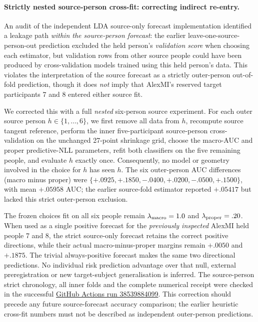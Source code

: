 \paragraph{Strictly nested source-person cross-fit: correcting indirect re-entry.}
\label{sec:p1-strict-nested-source-audit}
An audit of the independent LDA source-only
forecast implementation identified a leakage
path \emph{within the source-person forecast}:
the earlier leave-one-source-person-out prediction
excluded the held person's \emph{validation score}
when choosing each estimator, but validation rows
from other source people could have been produced
by cross-validation models trained using this
held person's data. This violates the interpretation
of the source forecast as a strictly outer-person
out-of-fold prediction, though it does \emph{not}
imply that AlexMI's reserved target participants
7 and 8 entered either source fit.

We corrected this with a full \emph{nested}
six-person source experiment. For each outer
source person $h\in\{1,\ldots,6\}$, we first
remove all data from $h$, recompute source
tangent reference, perform the inner
five-participant source-person cross-validation
on the unchanged 27-point shrinkage grid, choose
the macro-AUC and proper predictive-NLL parameters,
refit both classifiers on the five remaining
people, and evaluate $h$ exactly once.
Consequently, no model or geometry involved
in the choice for $h$ has seen $h$.
The six outer-person AUC differences
(macro minus proper) were
$\{+.0925,+.1850,-.0400,+.0200,-.0500,+.1500\}$,
with mean $+.05958$ AUC; the earlier
source-fold estimator reported $+.05417$
but lacked this strict outer-person exclusion.

The frozen choices fit on all six people
remain $\lambda_{\rm macro}=1.0$ and
$\lambda_{\rm proper}=.20$.
When used as a single positive forecast for
the \emph{previously inspected} AlexMI held
people 7 and 8, the strict source-only
forecast retains the correct positive
directions, while their actual macro-minus-proper
margins remain $+.0050$ and $+.1875$.
The trivial always-positive forecast makes
the same two directional predictions.
No individual risk prediction advantage
over that null, external preregistration or
new target-subject generalisation is inferred.
The source-person strict chronology, all
inner folds and the complete numerical
receipt were checked in the successful
\href{https://github.com/lindicaphxag-tech/kaggle/actions/runs/38539884099}
{GitHub Actions run 38539884099}.
This correction should precede any
future source-forecast accuracy comparison;
the earlier heuristic cross-fit numbers
must not be described as independent
outer-person predictions.
